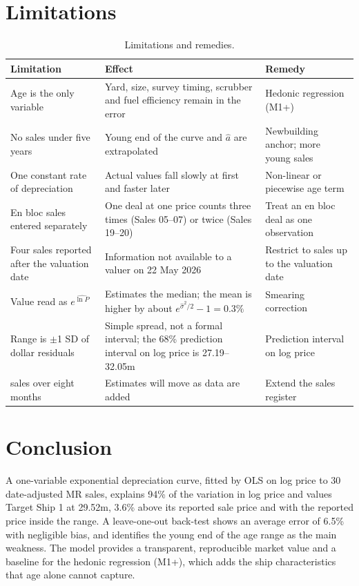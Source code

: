 \documentclass[11pt,a4paper]{article}
\newcommand{\usd}[1]{\text{US\$}#1}
\begin{document}
\section{Limitations}

\begin{table}[h]
\centering
\caption{Limitations and remedies.}
\label{tab:limits}
\small
\begin{tabularx}{\linewidth}{@{}>{\raggedright\arraybackslash}X >{\raggedright\arraybackslash}X >{\raggedright\arraybackslash}X@{}}
\toprule
Limitation & Effect & Remedy \\
\midrule
Age is the only variable & Yard, size, survey timing, scrubber and fuel efficiency remain in the error & Hedonic regression (M1+) \\
No sales under five years & Young end of the curve and $\hat a$ are extrapolated & Newbuilding anchor; more young sales \\
One constant rate of depreciation & Actual values fall slowly at first and faster later & Non-linear or piecewise age term \\
En bloc sales entered separately & One deal at one price counts three times (Sales 05--07) or twice (Sales 19--20) & Treat an en bloc deal as one observation \\
Four sales reported after the valuation date & Information not available to a valuer on 22 May 2026 & Restrict to sales up to the valuation date \\
Value read as $e^{\widehat{\ln P}}$ & Estimates the median; the mean is higher by about $e^{\hat\sigma^2/2} - 1 = 0.3\%$ & Smearing correction \citep{Duan1983} \\
Range is $\pm$1 SD of dollar residuals & Simple spread, not a formal interval; the 68\% prediction interval on log price is \usd{27.19}--32.05m & Prediction interval on log price \\
30 sales over eight months & Estimates will move as data are added & Extend the sales register \\
\bottomrule
\end{tabularx}
\end{table}

\section{Conclusion}

A one-variable exponential depreciation curve, fitted by OLS on log price to 30 date-adjusted MR sales, explains 94\% of the variation in log price and values Target Ship 1 at \usd{29.52}m, 3.6\% above its reported sale price and with the reported price inside the range. A leave-one-out back-test shows an average error of 6.5\% with negligible bias, and identifies the young end of the age range as the main weakness. The model provides a transparent, reproducible market value and a baseline for the hedonic regression (M1+), which adds the ship characteristics that age alone cannot capture.
\end{document}
